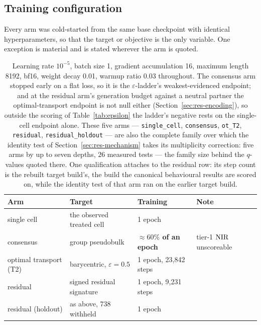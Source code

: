 \subsection{Training configuration}
\label{sec:app-training}

Every arm was cold-started from the same base checkpoint with identical hyperparameters, so that the
target or objective is the only variable. One exception is material and is stated wherever the arm
is quoted.

\begin{table}[htbp]
\centering
\footnotesize
\setlength{\tabcolsep}{3pt}
\begin{tabular}{llll}
\toprule
Arm & Target & Training & Note \\
\midrule
single cell & the observed treated cell & 1 epoch & \\
consensus & group pseudobulk & \textbf{$\approx 60\%$ of an epoch} & tier-1 $\textrm{NIR}$ unscoreable \\
optimal transport (T2) & barycentric, $\varepsilon{=}0.5$ & 1 epoch, 23{,}842 steps & \\
residual & signed residual signature & 1 epoch, 9{,}231 steps & \\
residual (holdout) & as above, 738 withheld & 1 epoch & \\
\bottomrule
\end{tabular}
\caption{Learning rate $10^{-5}$, batch size 1, gradient accumulation 16, maximum length 8192, bf16,
weight decay 0.01, warmup ratio 0.03 throughout. The consensus arm stopped early on a flat loss, so
it is the $\varepsilon$-ladder's weakest-evidenced endpoint; and at the residual arm's generation
budget against a neutral partner the optimal-transport endpoint is not null either
(Section~\ref{sec:res-encoding}), so outside the scoring of Table~\ref{tab:epsilon} the ladder's
negative rests on the single-cell endpoint alone.
These five arms --- \texttt{single\_cell}, \texttt{consensus}, \texttt{ot\_T2},
\texttt{residual}, \texttt{residual\_holdout} --- are also the complete family over which the
identity test of Section~\ref{sec:res-mechanism} takes its multiplicity correction: five arms by
up to seven depths, $26$ measured tests --- the family size behind the $q$-values quoted there.
One qualification attaches to the residual row: its step count is the rebuilt target build's, the
build the canonical behavioural results are scored on, while the identity test of that arm ran on
the earlier target build.}
\label{tab:trainconfig}
\end{table}


